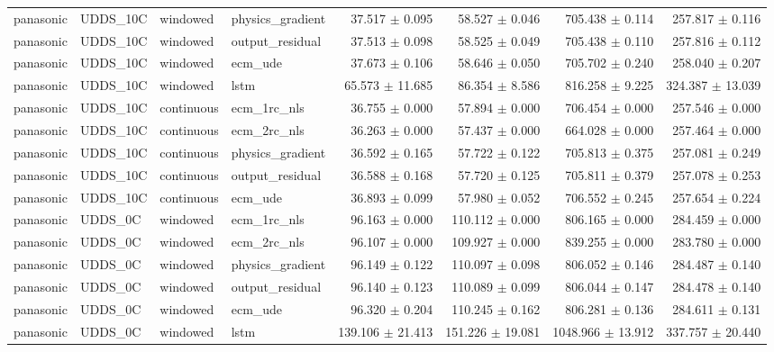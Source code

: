 \begin{longtable}{llllrrrr}
panasonic & UDDS\_10C & windowed & physics\_gradient & 37.517 $\pm$ 0.095 & 58.527 $\pm$ 0.046 & 705.438 $\pm$ 0.114 & 257.817 $\pm$ 0.116 \\
panasonic & UDDS\_10C & windowed & output\_residual & 37.513 $\pm$ 0.098 & 58.525 $\pm$ 0.049 & 705.438 $\pm$ 0.110 & 257.816 $\pm$ 0.112 \\
panasonic & UDDS\_10C & windowed & ecm\_ude & 37.673 $\pm$ 0.106 & 58.646 $\pm$ 0.050 & 705.702 $\pm$ 0.240 & 258.040 $\pm$ 0.207 \\
panasonic & UDDS\_10C & windowed & lstm & 65.573 $\pm$ 11.685 & 86.354 $\pm$ 8.586 & 816.258 $\pm$ 9.225 & 324.387 $\pm$ 13.039 \\
panasonic & UDDS\_10C & continuous & ecm\_1rc\_nls & 36.755 $\pm$ 0.000 & 57.894 $\pm$ 0.000 & 706.454 $\pm$ 0.000 & 257.546 $\pm$ 0.000 \\
panasonic & UDDS\_10C & continuous & ecm\_2rc\_nls & 36.263 $\pm$ 0.000 & 57.437 $\pm$ 0.000 & 664.028 $\pm$ 0.000 & 257.464 $\pm$ 0.000 \\
panasonic & UDDS\_10C & continuous & physics\_gradient & 36.592 $\pm$ 0.165 & 57.722 $\pm$ 0.122 & 705.813 $\pm$ 0.375 & 257.081 $\pm$ 0.249 \\
panasonic & UDDS\_10C & continuous & output\_residual & 36.588 $\pm$ 0.168 & 57.720 $\pm$ 0.125 & 705.811 $\pm$ 0.379 & 257.078 $\pm$ 0.253 \\
panasonic & UDDS\_10C & continuous & ecm\_ude & 36.893 $\pm$ 0.099 & 57.980 $\pm$ 0.052 & 706.552 $\pm$ 0.245 & 257.654 $\pm$ 0.224 \\
panasonic & UDDS\_0C & windowed & ecm\_1rc\_nls & 96.163 $\pm$ 0.000 & 110.112 $\pm$ 0.000 & 806.165 $\pm$ 0.000 & 284.459 $\pm$ 0.000 \\
panasonic & UDDS\_0C & windowed & ecm\_2rc\_nls & 96.107 $\pm$ 0.000 & 109.927 $\pm$ 0.000 & 839.255 $\pm$ 0.000 & 283.780 $\pm$ 0.000 \\
panasonic & UDDS\_0C & windowed & physics\_gradient & 96.149 $\pm$ 0.122 & 110.097 $\pm$ 0.098 & 806.052 $\pm$ 0.146 & 284.487 $\pm$ 0.140 \\
panasonic & UDDS\_0C & windowed & output\_residual & 96.140 $\pm$ 0.123 & 110.089 $\pm$ 0.099 & 806.044 $\pm$ 0.147 & 284.478 $\pm$ 0.140 \\
panasonic & UDDS\_0C & windowed & ecm\_ude & 96.320 $\pm$ 0.204 & 110.245 $\pm$ 0.162 & 806.281 $\pm$ 0.136 & 284.611 $\pm$ 0.131 \\
panasonic & UDDS\_0C & windowed & lstm & 139.106 $\pm$ 21.413 & 151.226 $\pm$ 19.081 & 1048.966 $\pm$ 13.912 & 337.757 $\pm$ 20.440 \\

\end{longtable}
